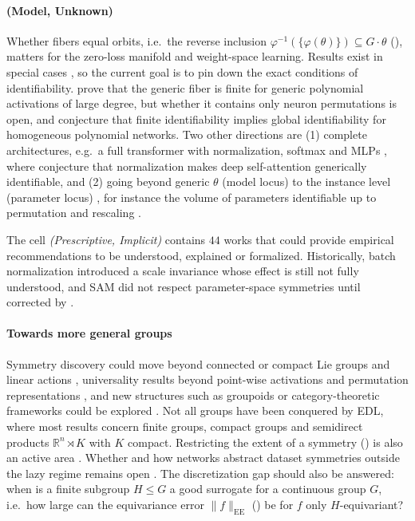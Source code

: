\documentclass[mathematics,review,submit,moreauthors]{Definitions/mdpi}
\begin{document}
\paragraph{(Model, Unknown)}
Whether fibers equal orbits, i.e.\ the reverse inclusion $\varphi^{-1}(\{\varphi(\theta)\})\subseteq G\cdot\theta$ (), matters for the zero-loss manifold and weight-space learning.
Results exist in special cases \citep{phuong2019,bona-pellissier2023,marchetti2025a,gegenfurtner2026,usevich2025}, so the current goal is to pin down the exact conditions of identifiability.
\citet{shahverdi2026} prove that the generic fiber is finite for generic polynomial activations of large degree, but whether it contains only neuron permutations is open, and \citet{usevich2025} conjecture that finite identifiability implies global identifiability for homogeneous polynomial networks.
Two other directions are (1) complete architectures, e.g.\ a full transformer with normalization, softmax and MLPs \citep{tran2025iclr,zhang2025p4icml}, where \citet{henry2025} conjecture that normalization makes deep self-attention generically identifiable, and (2) going beyond generic $\theta$ (model locus) to the instance level (parameter locus) \citep{grigsby2023p4icml,grillo2026}, for instance the volume of parameters identifiable up to permutation and rescaling \citep{grillo2026}.

\vspace{5mm}

The cell \emph{(Prescriptive, Implicit)} contains $44$ works that could provide empirical recommendations to be understood, explained or formalized.
Historically, batch normalization \citep{ioffe2015p3icml} introduced a scale invariance whose effect is still not fully understood, and SAM \citep{foret2021} did not respect parameter-space symmetries until corrected by \citet{kwon2021p3icml}.

\paragraph{Towards more general groups}
Symmetry discovery could move beyond connected or compact Lie groups and linear actions \citep{ennes2025fcm,escriche2025}, universality results beyond point-wise activations and permutation representations \citep{pacini2026}, and new structures such as groupoids or category-theoretic frameworks could be explored \citep{sareen2026,basheer2025ijdsa}.
Not all groups have been conquered by EDL, where most results concern finite groups, compact groups and semidirect products $\mathbb{R}^n\rtimes K$ with $K$ compact.
Restricting the extent of a symmetry () is also an active area \citep{goel2025,urbano2026}.
Whether and how networks abstract dataset symmetries outside the lazy regime remains open \citep{perin2025,jacot2025}.
The discretization gap \citep{ennes2025fcm,ali2026} should also be answered: when is a finite subgroup $H\le G$ a good surrogate for a continuous group $G$, i.e.\ how large can the equivariance error $\lVert f\rVert_{\mathrm{EE}}$ () be for $f$ only $H$-equivariant?
\end{document}
